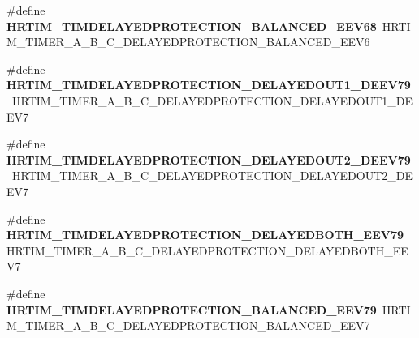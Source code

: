 \begin{DoxyCompactItemize}
\item 
\mbox{\label{group___h_a_l___h_r_t_i_m___aliased___macros_gacc9d18290b90bd3ba98bc6aade450b32}} 
\#define {\bfseries H\+R\+T\+I\+M\+\_\+\+T\+I\+M\+D\+E\+L\+A\+Y\+E\+D\+P\+R\+O\+T\+E\+C\+T\+I\+O\+N\+\_\+\+B\+A\+L\+A\+N\+C\+E\+D\+\_\+\+E\+E\+V68}~H\+R\+T\+I\+M\+\_\+\+T\+I\+M\+E\+R\+\_\+\+A\+\_\+\+B\+\_\+\+C\+\_\+\+D\+E\+L\+A\+Y\+E\+D\+P\+R\+O\+T\+E\+C\+T\+I\+O\+N\+\_\+\+B\+A\+L\+A\+N\+C\+E\+D\+\_\+\+E\+E\+V6
\item 
\mbox{\label{group___h_a_l___h_r_t_i_m___aliased___macros_gaf2fa730ef2ff94596dc103780c6ea28a}} 
\#define {\bfseries H\+R\+T\+I\+M\+\_\+\+T\+I\+M\+D\+E\+L\+A\+Y\+E\+D\+P\+R\+O\+T\+E\+C\+T\+I\+O\+N\+\_\+\+D\+E\+L\+A\+Y\+E\+D\+O\+U\+T1\+\_\+\+D\+E\+E\+V79}~H\+R\+T\+I\+M\+\_\+\+T\+I\+M\+E\+R\+\_\+\+A\+\_\+\+B\+\_\+\+C\+\_\+\+D\+E\+L\+A\+Y\+E\+D\+P\+R\+O\+T\+E\+C\+T\+I\+O\+N\+\_\+\+D\+E\+L\+A\+Y\+E\+D\+O\+U\+T1\+\_\+\+D\+E\+E\+V7
\item 
\mbox{\label{group___h_a_l___h_r_t_i_m___aliased___macros_ga8facb4c8782a5539246df190451ebf91}} 
\#define {\bfseries H\+R\+T\+I\+M\+\_\+\+T\+I\+M\+D\+E\+L\+A\+Y\+E\+D\+P\+R\+O\+T\+E\+C\+T\+I\+O\+N\+\_\+\+D\+E\+L\+A\+Y\+E\+D\+O\+U\+T2\+\_\+\+D\+E\+E\+V79}~H\+R\+T\+I\+M\+\_\+\+T\+I\+M\+E\+R\+\_\+\+A\+\_\+\+B\+\_\+\+C\+\_\+\+D\+E\+L\+A\+Y\+E\+D\+P\+R\+O\+T\+E\+C\+T\+I\+O\+N\+\_\+\+D\+E\+L\+A\+Y\+E\+D\+O\+U\+T2\+\_\+\+D\+E\+E\+V7
\item 
\mbox{\label{group___h_a_l___h_r_t_i_m___aliased___macros_ga81abc6daa4a2456ca1428c3fe1796e52}} 
\#define {\bfseries H\+R\+T\+I\+M\+\_\+\+T\+I\+M\+D\+E\+L\+A\+Y\+E\+D\+P\+R\+O\+T\+E\+C\+T\+I\+O\+N\+\_\+\+D\+E\+L\+A\+Y\+E\+D\+B\+O\+T\+H\+\_\+\+E\+E\+V79}~H\+R\+T\+I\+M\+\_\+\+T\+I\+M\+E\+R\+\_\+\+A\+\_\+\+B\+\_\+\+C\+\_\+\+D\+E\+L\+A\+Y\+E\+D\+P\+R\+O\+T\+E\+C\+T\+I\+O\+N\+\_\+\+D\+E\+L\+A\+Y\+E\+D\+B\+O\+T\+H\+\_\+\+E\+E\+V7
\item 
\mbox{\label{group___h_a_l___h_r_t_i_m___aliased___macros_gad90cefe9f64cf5f3efe38213706b4f94}} 
\#define {\bfseries H\+R\+T\+I\+M\+\_\+\+T\+I\+M\+D\+E\+L\+A\+Y\+E\+D\+P\+R\+O\+T\+E\+C\+T\+I\+O\+N\+\_\+\+B\+A\+L\+A\+N\+C\+E\+D\+\_\+\+E\+E\+V79}~H\+R\+T\+I\+M\+\_\+\+T\+I\+M\+E\+R\+\_\+\+A\+\_\+\+B\+\_\+\+C\+\_\+\+D\+E\+L\+A\+Y\+E\+D\+P\+R\+O\+T\+E\+C\+T\+I\+O\+N\+\_\+\+B\+A\+L\+A\+N\+C\+E\+D\+\_\+\+E\+E\+V7

\end{DoxyCompactItemize}
